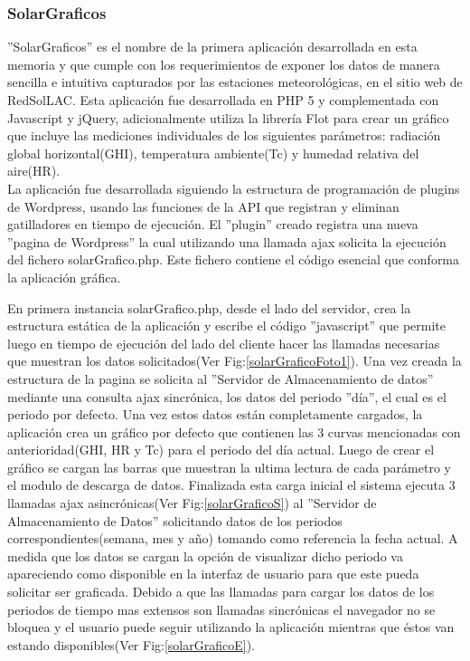 \subsubsection{SolarGraficos}
''SolarGraficos'' es el nombre de la primera aplicación desarrollada en esta memoria y que cumple con los requerimientos de exponer los datos de manera sencilla e intuitiva capturados por las estaciones meteorológicas, en el sitio web de RedSolLAC. Esta aplicación fue desarrollada en PHP 5 y complementada con Javascript y jQuery, adicionalmente utiliza la librería Flot para crear un gráfico que incluye las mediciones individuales de los siguientes parámetros: radiación global horizontal(GHI), temperatura ambiente(Tc) y humedad relativa del aire(HR).\\

La aplicación fue desarrollada siguiendo la estructura de programación de plugins de Wordpress\cite{aplicacion:wplugins}, usando las funciones de la API que registran y eliminan gatilladores en tiempo de ejecución. El ''plugin'' creado registra una nueva ''pagina de Wordpress'' la cual utilizando una llamada ajax solicita la ejecución del fichero solarGrafico.php. Este fichero contiene el código esencial que conforma la aplicación gráfica.

En primera instancia solarGrafico.php, desde el lado del servidor, crea la estructura estática de la aplicación y escribe el código ''javascript'' que permite luego en tiempo de ejecución del lado del cliente hacer las llamadas necesarias que muestran los datos solicitados(Ver Fig:\ref{solarGraficoFoto1}). Una vez creada la estructura de la pagina se solicita al ''Servidor de Almacenamiento de datos'' mediante una consulta ajax sincrónica, los datos del periodo ''día'', el cual es el periodo por defecto. Una vez estos datos están completamente cargados, la aplicación crea un gráfico por defecto que contienen las 3 curvas mencionadas con anterioridad(GHI, HR y Tc) para el periodo del día actual. Luego de crear el gráfico se cargan las barras que muestran la ultima lectura de cada parámetro y el modulo de descarga de datos. Finalizada esta carga inicial el sistema ejecuta 3 llamadas ajax asincrónicas(Ver Fig:\ref{solarGraficoS}) al ''Servidor de Almacenamiento de Datos'' solicitando datos de los periodos correspondientes(semana, mes y año) tomando como referencia la fecha actual. A medida que los datos se cargan la opción de visualizar dicho periodo va apareciendo como disponible en la interfaz de usuario para que este pueda solicitar ser graficada. Debido a que las llamadas para cargar los datos de los periodos de tiempo mas extensos son llamadas sincrónicas el navegador no se bloquea y el usuario puede seguir utilizando la aplicación mientras que éstos van estando disponibles(Ver Fig:\ref{solarGraficoE}).

